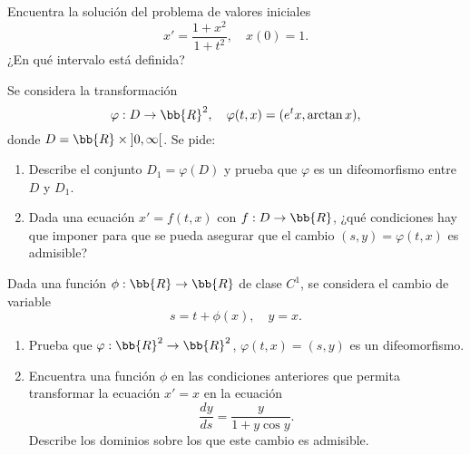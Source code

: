 \documentclass[12pt]{article}
\begin{document}
    \begin{ejercicio}
        Encuentra la solución del problema de valores iniciales
        \begin{equation*}
            x' = \dfrac{1 + x^2}{1 + t^2}, \quad x(0) = 1.
        \end{equation*}
        ¿En qué intervalo está definida?
    \end{ejercicio}

    \begin{ejercicio}
        Se considera la transformación
        \begin{equation*}
            \varphi : D \to \bb{R}^2, \quad \varphi(t, x) = (e^{t}x, \arctan x),
        \end{equation*}
        donde $D = \bb{R} \times \left]0, \infty\right[$. Se pide:
        \begin{enumerate}
            \item Describe el conjunto $D_1 = \varphi(D)$ y prueba que $\varphi$ es un difeomorfismo entre $D$ y $D_1$.
            \item Dada una ecuación $x' = f(t, x)$ con $f : D \to \bb{R}$, ¿qué condiciones hay que imponer para que se pueda asegurar que el cambio $(s, y) = \varphi(t, x)$ es admisible?
        \end{enumerate}
    \end{ejercicio}

    \begin{ejercicio}
        Dada una función $\phi : \bb{R} \to \bb{R}$ de clase $C^1$, se considera el cambio de variable
        \begin{equation*}
            s = t + \phi(x), \quad y = x.
        \end{equation*}
        \begin{enumerate}
            \item Prueba que $\varphi : \bb{R}^2 \to \bb{R}^2$, $\varphi(t, x) = (s, y)$ es un difeomorfismo.
            \item Encuentra una función $\phi$ en las condiciones anteriores que permita transformar la ecuación $x' = x$ en la ecuación
            \begin{equation*}
                \dfrac{dy}{ds} = \dfrac{y}{1 + y \cos y}.
            \end{equation*}
            Describe los dominios sobre los que este cambio es admisible.
        \end{enumerate}
    \end{ejercicio}
\end{document}
